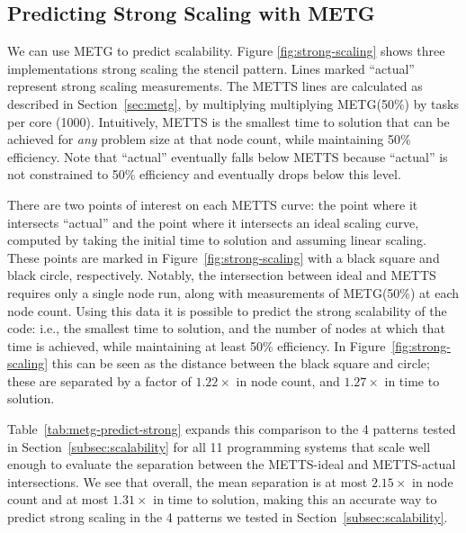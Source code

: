 {\color{blue}
\subsection{Predicting Strong Scaling with METG}




We can use METG to predict scalability. Figure
\ref{fig:strong-scaling} shows three
implementations strong scaling the stencil pattern. Lines marked ``actual''
represent strong scaling measurements. The METTS lines are calculated as described in Section~\ref{sec:metg}, by multiplying multiplying METG(50\%) by tasks per core (1000). Intuitively, METTS is the smallest time to solution that
can be achieved for \emph{any} problem size at that node count, while
maintaining 50\% efficiency. Note that ``actual'' eventually falls
below METTS because ``actual'' is not constrained to 50\%
efficiency and eventually drops below this level.

There are two points of interest on each METTS curve: the point
where it intersects ``actual'' and the point where it intersects an
ideal scaling curve, computed by taking the initial time to solution
and assuming linear scaling. These points are marked in
Figure~\ref{fig:strong-scaling} with a black square and black circle,
respectively. Notably, the intersection between ideal and METTS
requires only a single node run, along with measurements of METG(50\%)
at each node count. Using this data it is possible to predict the
strong scalability of the code: i.e., the smallest time to solution,
and the number of nodes at which that time is achieved, while
maintaining at least 50\% efficiency. In
Figure~\ref{fig:strong-scaling} this can be seen as the distance
between the black square and circle; these are separated by a factor of
$1.22\times$ in node count, and $1.27\times$ in time to solution.

Table~\ref{tab:metg-predict-strong} expands this comparison to the 4
patterns tested in Section~\ref{subsec:scalability} for all 11
programming systems that scale well enough to evaluate the separation
between the METTS-ideal and METTS-actual intersections. We see that
overall, the mean separation is at most $2.15\times$ in node count
and at most $1.31\times$ in time to solution, making this an
accurate way to predict strong scaling in the 4 patterns we tested in
Section~\ref{subsec:scalability}.

}
